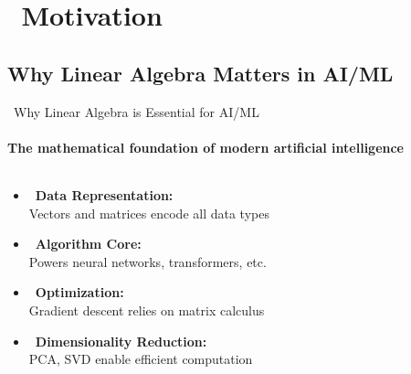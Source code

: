 \documentclass[12pt,aspectratio=169]{beamer}
\begin{document}
\section[Motivation]{\faRocket \, Motivation}
\subsection{Why Linear Algebra Matters in AI/ML}

\begin{frame}{\faRocket \, Why Linear Algebra is Essential for AI/ML}
\framesubtitle{The mathematical foundation of modern artificial intelligence}

\begin{columns}[T]
    \begin{column}{0.6\textwidth}
        \begin{itemize}[<+->]
            \item \faDatabase \, \textbf{Data Representation:} \\
                  \small Vectors and matrices encode all data types
            \item \faCogs \, \textbf{Algorithm Core:} \\
                  \small Powers neural networks, transformers, etc.
            \item \faChartLine \, \textbf{Optimization:} \\
                  \small Gradient descent relies on matrix calculus
            \item \faCompress \, \textbf{Dimensionality Reduction:} \\
                  \small PCA, SVD enable efficient computation
        \end{itemize}
    \end{column}
    \begin{column}{0.35\textwidth}
    \end{column}
\end{columns}
\end{frame}
\end{document}
